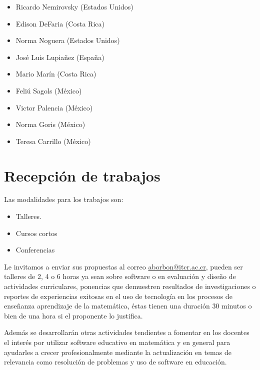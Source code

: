 \documentclass[10pt, notumble, letterpaper]{leaflet}
\begin{document}
\begin{itemize}
\item Ricardo Nemirovsky (Estados Unidos)

\item Edison DeFaria (Costa Rica)

\item Norma Noguera (Estados Unidos)

\item José Luis Lupiañez (España)

\item Mario Marín (Costa Rica)

\item Feliú Sagols (México)

\item Victor Palencia (México)

\item Norma Goris (México)

\item Teresa Carrillo (México)
\end{itemize}

\newpage

\section{Recepción de trabajos}

Las modalidades para los trabajos son:

\begin{itemize}
\item Talleres.

\item Cursos cortos

\item Conferencias
\end{itemize}

Le invitamos a enviar sus propuestas al correo \url{aborbon@itcr.ac.cr}, pueden ser talleres de 2, 4 o 6 horas ya sean sobre software o en evaluación  y diseño de actividades curriculares, ponencias que demuestren resultados de investigaciones o reportes de experiencias exitosas en el uso de tecnología en los procesos de enseñanza aprendizaje de la  matemática, éstas  tienen una duración  30 minutos o bien de una hora si el proponente lo justifica. 

Además se desarrollarán otras actividades tendientes a fomentar en los docentes el interés por utilizar software educativo en matemática y en general para ayudarles a crecer profesionalmente mediante la actualización en temas de relevancia como resolución de problemas y uso de software en educación. 
\end{document}
